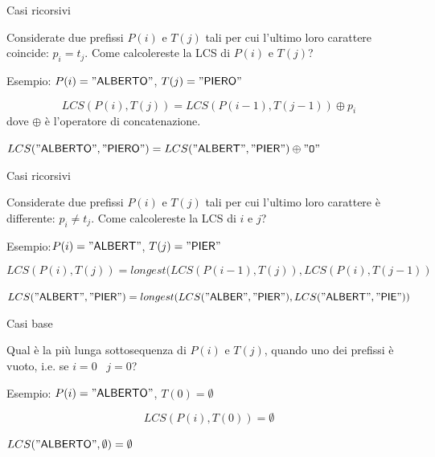 \begin{frame}{Casi ricorsivi}


Considerate due prefissi $P(i)$ e $T(j)$ tali per cui l'ultimo loro
carattere coincide: $p_i = t_j$. Come calcolereste la  LCS di $P(i)$ e $T(j)$?

\BIL
\item Esempio: $P(i)="\textsf{ALBERTO}"$, $T(j)="\textsf{PIERO}"$
\EIL

\pause
\bigskip
{}
\[
  LCS(P(i),T(j)) = LCS(P(i-1),T(j-1)) \oplus p_i
\]
dove $\oplus$ è l'operatore di concatenazione.

\BIL
\item $LCS("\textsf{ALBERTO}","\textsf{PIERO}") = LCS("\textsf{ALBERT}","\textsf{PIER}") \oplus "\mathtt{O}"$
\EIL

\end{frame}

\begin{frame}{Casi ricorsivi}


Considerate due prefissi $P(i)$ e $T(j)$ tali per cui l'ultimo loro
carattere è differente: $p_i \neq t_j$. Come calcolereste la  LCS di $i$ e $j$?

\BIL
\item Esempio:$P(i)="\textsf{ALBERT}"$, $T(j)="\textsf{PIER}"$
\EIL

\bigskip
{}
\pause
\[
  LCS(P(i),T(j)) = \mathit{longest}( LCS(P(i-1),T(j)), LCS(P(i),T(j-1))
\]

\BIL
\item $LCS("\textsf{ALBERT}","\textsf{PIER}") = longest(
  LCS("\textsf{ALBER}","\textsf{PIER}"),
  LCS("\textsf{ALBERT}","\textsf{PIE}") )$
\EIL

\end{frame}

\begin{frame}{Casi base}
  


Qual è la più lunga sottosequenza di $P(i)$ e $T(j)$, quando uno dei
prefissi è vuoto, i.e. se $i=0$ \OR\ $j=0$?
\BIL
\item Esempio: $P(i)="\textsf{ALBERTO}"$, $T(0)=\emptyset$
\EIL

\pause
\bigskip
{}
\[
  LCS(P(i),T(0)) = \emptyset
\]

\BIL
\item $LCS("\textsf{ALBERTO}",\emptyset ) = \emptyset $
\EIL

\end{frame}

